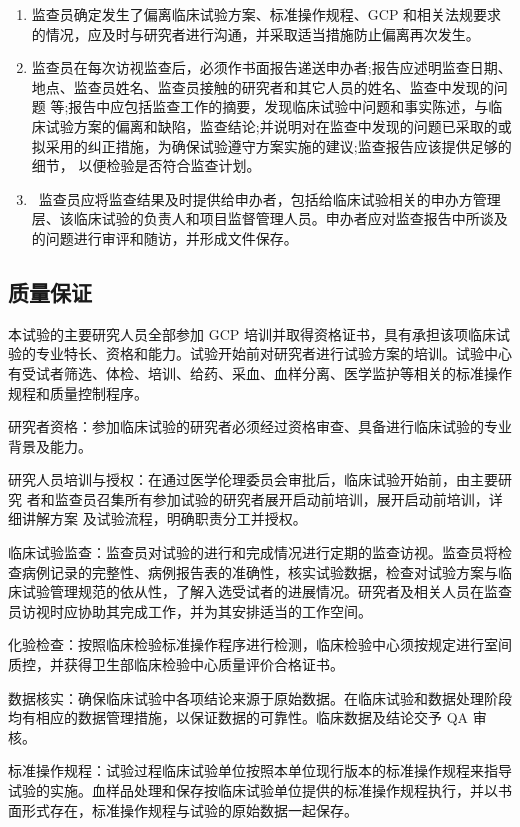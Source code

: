 \documentclass[
  chinese-hans,
  letterpaper,
  DIV=11,
  numbers=noendperiod]{scrreprt}
\begin{document}
\begin{enumerate}
\item
  监查员确定发生了偏离临床试验方案、标准操作规程、GCP
  和相关法规要求的情况，应及时与研究者进行沟通，并采取适当措施防止偏离再次发生。
\item
  监查员在每次访视监查后，必须作书面报告递送申办者;报告应述明监查日期、地点、监查员姓名、监查员接触的研究者和其它人员的姓名、监查中发现的问题
  等;报告中应包括监查工作的摘要，发现临床试验中问题和事实陈述，与临床试验方案的偏离和缺陷，监查结论;并说明对在监查中发现的问题已采取的或拟采用的纠正措施，为确保试验遵守方案实施的建议;监查报告应该提供足够的细节，
  以便检验是否符合监查计划。
\item
  ~监查员应将监查结果及时提供给申办者，包括给临床试验相关的申办方管理层、该临床试验的负责人和项目监督管理人员。申办者应对监查报告中所谈及的问题进行审评和随访，并形成文件保存。
\end{enumerate}

\subsection{质量保证}\label{ux8d28ux91cfux4fddux8bc1}

本试验的主要研究人员全部参加 GCP
培训并取得资格证书，具有承担该项临床试验的专业特长、资格和能力。试验开始前对研究者进行试验方案的培训。试验中心有受试者筛选、体检、培训、给药、采血、血样分离、医学监护等相关的标准操作规程和质量控制程序。

研究者资格：参加临床试验的研究者必须经过资格审查、具备进行临床试验的专业背景及能力。

研究人员培训与授权：在通过医学伦理委员会审批后，临床试验开始前，由主要研究
者和监查员召集所有参加试验的研究者展开启动前培训，展开启动前培训，详细讲解方案
及试验流程，明确职责分工并授权。

临床试验监查：监查员对试验的进行和完成情况进行定期的监查访视。监查员将检查病例记录的完整性、病例报告表的准确性，核实试验数据，检查对试验方案与临床试验管理规范的依从性，了解入选受试者的进展情况。研究者及相关人员在监查员访视时应协助其完成工作，并为其安排适当的工作空间。

化验检查：按照临床检验标准操作程序进行检测，临床检验中心须按规定进行室间质控，并获得卫生部临床检验中心质量评价合格证书。

数据核实：确保临床试验中各项结论来源于原始数据。在临床试验和数据处理阶段均有相应的数据管理措施，以保证数据的可靠性。临床数据及结论交予
QA 审核。

标准操作规程：试验过程临床试验单位按照本单位现行版本的标准操作规程来指导试验的实施。血样品处理和保存按临床试验单位提供的标准操作规程执行，并以书面形式存在，标准操作规程与试验的原始数据一起保存。
\end{document}

